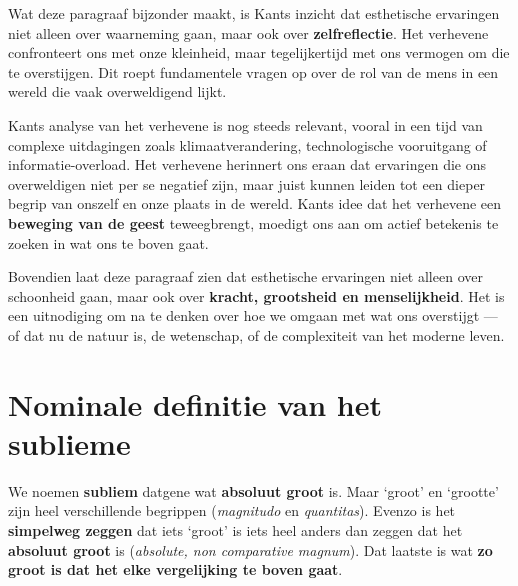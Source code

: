 \begin{mdframed}[leftmargin=0pt,rightmargin=0pt,backgroundcolor=blue!6,linecolor=white,innertopmargin=6pt,innerbottommargin=6pt]
Wat deze paragraaf bijzonder maakt, is Kants inzicht dat esthetische ervaringen niet alleen over waarneming gaan, maar ook over \textbf{zelfreflectie}. Het verhevene confronteert ons met onze kleinheid, maar tegelijkertijd met ons vermogen om die te overstijgen. Dit roept fundamentele vragen op over de rol van de mens in een wereld die vaak overweldigend lijkt.

Kants analyse van het verhevene is nog steeds relevant, vooral in een tijd van complexe uitdagingen zoals klimaatverandering, technologische vooruitgang of informatie-overload. Het verhevene herinnert ons eraan dat ervaringen die ons overweldigen niet per se negatief zijn, maar juist kunnen leiden tot een dieper begrip van onszelf en onze plaats in de wereld. Kants idee dat het verhevene een \textbf{beweging van de geest} teweegbrengt, moedigt ons aan om actief betekenis te zoeken in wat ons te boven gaat.

Bovendien laat deze paragraaf zien dat esthetische ervaringen niet alleen over schoonheid gaan, maar ook over \textbf{kracht, grootsheid en menselijkheid}. Het is een uitnodiging om na te denken over hoe we omgaan met wat ons overstijgt --- of dat nu de natuur is, de wetenschap, of de complexiteit van het moderne leven.

\end{mdframed}


\section{Nominale definitie van het sublieme}

We noemen \textbf{subliem} datgene wat \textbf{absoluut groot} is. Maar ‘groot’ en ‘grootte’ zijn heel verschillende begrippen (\textit{magnitudo} en \textit{quantitas}). Evenzo is het \textbf{simpelweg zeggen} dat iets ‘groot’ is iets heel anders dan zeggen dat het \textbf{absoluut groot} is (\textit{absolute, non comparative magnum}). Dat laatste is wat \textbf{zo groot is dat het elke vergelijking te boven gaat}.

